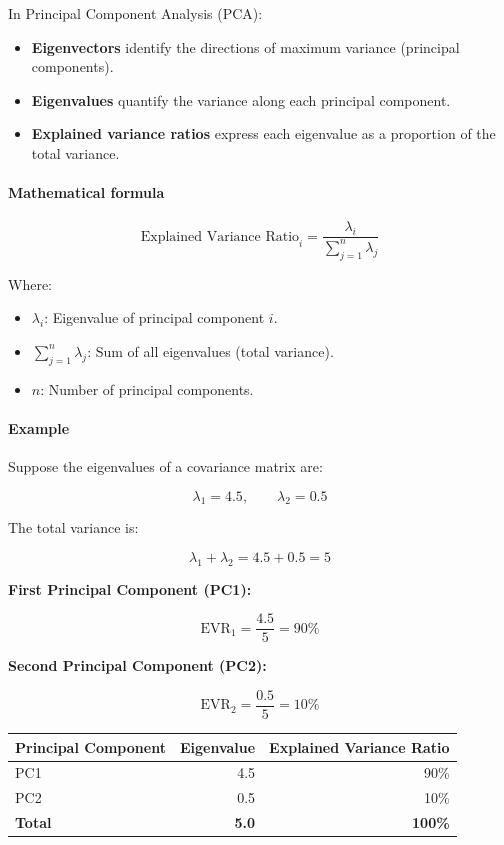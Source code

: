 \documentclass[11pt]{article}
\providecommand{\tightlist}{%
      \setlength{\itemsep}{0pt}\setlength{\parskip}{0pt}}
\begin{document}
In Principal Component Analysis (PCA):

\begin{itemize}
\tightlist
\item
  \textbf{Eigenvectors} identify the directions of maximum variance
  (principal components).
\item
  \textbf{Eigenvalues} quantify the variance along each principal
  component.
\item
  \textbf{Explained variance ratios} express each eigenvalue as a
  proportion of the total variance.
\end{itemize}

\paragraph{Mathematical formula}\label{mathematical-formula}

\[
\boxed{\text{Explained Variance Ratio}_i = \frac{\lambda_i}{\sum_{j=1}^{n}\lambda_j}}
\]

Where:

\begin{itemize}
\tightlist
\item
  \(\lambda_i\): Eigenvalue of principal component \(i\).
\item
  \(\sum_{j=1}^{n}\lambda_j\): Sum of all eigenvalues (total variance).
\item
  \(n\): Number of principal components.
\end{itemize}

\paragraph{Example}\label{example}

Suppose the eigenvalues of a covariance matrix are:

\[
\lambda_1=4.5,\qquad \lambda_2=0.5
\]

The total variance is:

\[
\lambda_1+\lambda_2=4.5+0.5=5
\]

\textbf{First Principal Component (PC1):}

\[
\text{EVR}_1=\frac{4.5}{5}=\boxed{90\%}
\]

\textbf{Second Principal Component (PC2):}

\[
\text{EVR}_2=\frac{0.5}{5}=\boxed{10\%}
\]

{\def\LTcaptype{none} %
\begin{longtable}[]{@{}lrr@{}}
\toprule\noalign{}
Principal Component & Eigenvalue & Explained Variance Ratio \\
\midrule\noalign{}
\endhead
\bottomrule\noalign{}
\endlastfoot
PC1 & 4.5 & 90\% \\
PC2 & 0.5 & 10\% \\
\textbf{Total} & \textbf{5.0} & \textbf{100\%} \\
\end{longtable}
}
\end{document}
